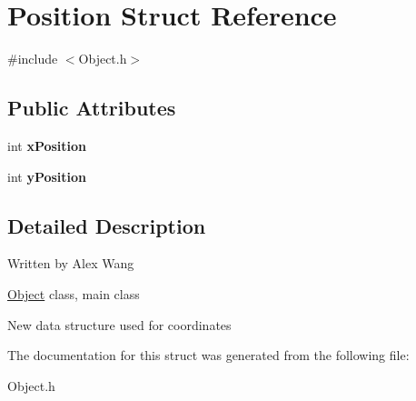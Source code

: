 \hypertarget{structPosition}{\section{Position Struct Reference}
\label{structPosition}
}


{\ttfamily \#include $<$Object.\-h$>$}

\subsection*{Public Attributes}
\begin{DoxyCompactItemize}
\item 
\hypertarget{structPosition_a98b626e4dc812dc82b59b830f0c11e9c}{int {\bfseries x\-Position}}\label{structPosition_a98b626e4dc812dc82b59b830f0c11e9c}

\item 
\hypertarget{structPosition_af49c9e30e516f34e6ec5458b171208d0}{int {\bfseries y\-Position}}\label{structPosition_af49c9e30e516f34e6ec5458b171208d0}

\end{DoxyCompactItemize}


\subsection{Detailed Description}
Written by Alex Wang

\hyperlink{classObject}{Object} class, main class

New data structure used for coordinates 

The documentation for this struct was generated from the following file\-:\begin{DoxyCompactItemize}
\item 
Object.\-h\end{DoxyCompactItemize}
